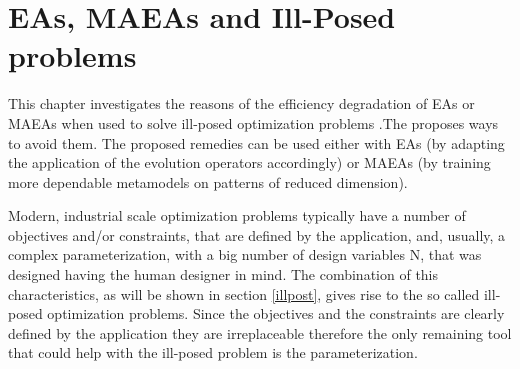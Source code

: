 \ifpdf
    \graphicspath{{4/figures/PNG/}{4/figures/PDF/}{3/figures/}}
\else
    \graphicspath{{4/figures/EPS/}{4/figures/}}
\fi

\chapter{EAs, MAEAs and Ill-Posed problems} %
\label{VarCorrChapter}

This chapter investigates the reasons of the efficiency degradation of EAs or MAEAs when used to solve ill-posed optimization problems \cite{Salomon,Roy_2002a,Ghisu_2010}.The proposes ways to avoid them. The proposed remedies can be used either with EAs (by adapting the application of the evolution operators accordingly) or MAEAs (by training more dependable metamodels on patterns of reduced dimension).

Modern, industrial scale optimization problems typically have a number of objectives and/or constraints, that are defined by the application, and, usually, a complex parameterization, with a big number of design variables N, that was designed having the human designer in mind. The combination of this characteristics, as will be shown in section \ref{illpost}, gives rise to the so called ill-posed  optimization problems. Since the objectives and the constraints are clearly defined by the application they are irreplaceable therefore the only remaining tool that could help with the ill-posed problem is the parameterization. 

